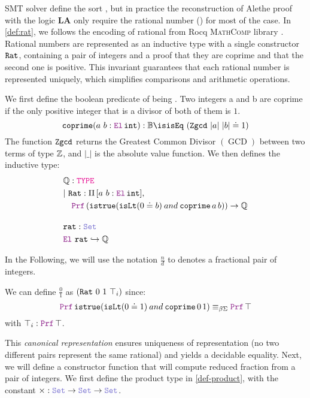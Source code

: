 
SMT solver define the sort , but in practice the reconstruction of Alethe proof with the logic \textbf{LA} only require the rational number (\Q) for most of the case.
In \cref{def:rat}, we follows the encoding of rational from Rocq \cite{Rocq-refman} \textsc{MathComp} library \cite{mathcomp}.
Rational numbers are represented as an inductive type with a single constructor $\texttt{\upshape{Rat}}$, containing a pair of integers and a proof that they are coprime and that the second one is positive.
This invariant guarantees that each rational number is represented uniquely, which simplifies comparisons and arithmetic operations.

\begin{definition}[Rational]\label{def:rat}
We first define the boolean predicate of being . Two integers a and b are coprime if the only positive integer that is a divisor of both of them is $1$.
\begin{equation*}
\kw{coprime} (a~b: \el\,\kw{int}): \B \is  \kw{isEq}~(\kw{Zgcd}~|a|~|b| \doteq 1)
\end{equation*}
The function $\texttt{\upshape{Zgcd}}$ returns the Greatest Common Divisor $(\mathop{GCD})$ between two terms of type $\mathbb{Z}$, and $|\_|$ is the absolute value function.
We then defines the inductive type:
\begin{align*}
& \Q: \type \\
& |~\kw{Rat}: \Pi\,[a~b: \el\,\kw{int}],\\
& \quad \prf\, (\kw{istrue} (\kw{isLt} (0 \doteq b) \mathbin{and} \kw{coprime}\,a\,b)) \ra \Q \\[1em]
&\kw{rat}: \set{} \\
&\el~\kw{rat} \re \Q
\end{align*}
\end{definition}

In the Following, we will use the notation $\frac{n}{d}$ to denotes a fractional pair of integers.


\begin{example}
We can define $\frac{0}{1}$ as $(\texttt{\upshape{Rat}}~0~1~\top_i)$ since:
\[
\prf\, \kw{istrue} (\kw{isLt} (0 \doteq 1) \mathbin{and} \kw{coprime}\,0\,1) \equivL \prf\,\top
\]
with $\top_i : \prf\,\top$.
\end{example}

This \emph{canonical representation} ensures uniqueness of representation (no two different pairs represent the same rational) and yields a decidable equality.
Next, we will define a constructor function that will compute reduced fraction from a pair of integers.
We first define the product type in \cref{def-product}, with the constant $\times: \set \ra \set \ra \set$.

